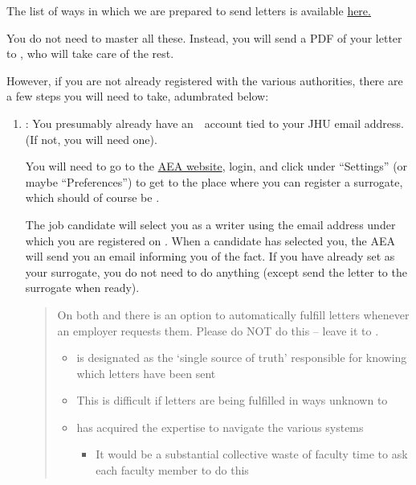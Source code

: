\documentclass{\econtex}
\begin{document}
The list of ways in which we are prepared to send letters is available {\href{\pageurl/RecLetters/#students-and-staff}{here.}}

You do not need to master all these. Instead, you will send a PDF of your letter to {\JMStaffName}, who will take care of the rest.

However, if you are not already registered with the various authorities, there are a few steps you will need to take, adumbrated below:

\begin{enumerate}

\item \textbf{\AEAref}:
  You presumably already have an~{\AEAref}~account tied to your JHU email address.  (If not, you will need one).

  You will need to go to the \href{\AEAurl}{AEA website}, login,  and click under ``Settings'' (or maybe ``Preferences'') to get to the place where you can register a surrogate, which should of course be \jmstaffemail.

  \hypertarget{let-jmstaff-fulfill-letters}{}
  The job candidate will select you as a writer using the email address under which you are registered on \AEALink.  When a candidate has selected you, the AEA will send you an email informing you of the fact.  If you have already set {\JMStaffName} as your surrogate, you do not need to do anything (except send the letter to the surrogate when ready).


  \begin{quote}
    On both {\EJM} and {\AEAref} there is an option to automatically fulfill letters whenever an employer requests them. Please do NOT do this -- leave it to {\JMStaffName}.
    \begin{itemize}
    \item {\JMStaffName} is designated as the `single source of truth' responsible for knowing which letters have been sent
    \item This is difficult if letters are being fulfilled in ways unknown to {\JMStaffName}
    \item {\JMStaffName} has acquired the expertise to navigate the various systems
      \begin{itemize}
        \item It would be a substantial collective waste of faculty time to ask each faculty member to do this
        \end{itemize}
      \end{itemize}
  \end{quote}
  

\end{enumerate}
\end{document}
